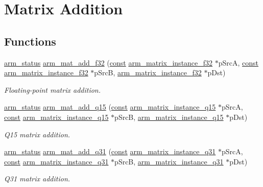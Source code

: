 \hypertarget{group___matrix_add}{\section{Matrix Addition}
\label{group___matrix_add}
}
\subsection*{Functions}
\begin{DoxyCompactItemize}
\item 
\hyperlink{arm__math_8h_a5e459c6409dfcd2927bb8a57491d7cf6}{arm\-\_\-status} \hyperlink{group___matrix_add_ga04bbf64a5f9c9e57dd1efb26a768aba1}{arm\-\_\-mat\-\_\-add\-\_\-f32} (\hyperlink{group___n_a_m_e_ga7ae6d0e43244213b34de2c2b9aa30da6}{const} \hyperlink{structarm__matrix__instance__f32}{arm\-\_\-matrix\-\_\-instance\-\_\-f32} $\ast$p\-Src\-A, \hyperlink{group___n_a_m_e_ga7ae6d0e43244213b34de2c2b9aa30da6}{const} \hyperlink{structarm__matrix__instance__f32}{arm\-\_\-matrix\-\_\-instance\-\_\-f32} $\ast$p\-Src\-B, \hyperlink{structarm__matrix__instance__f32}{arm\-\_\-matrix\-\_\-instance\-\_\-f32} $\ast$p\-Dst)
\begin{DoxyCompactList}\small\item\em Floating-\/point matrix addition. \end{DoxyCompactList}\item 
\hyperlink{arm__math_8h_a5e459c6409dfcd2927bb8a57491d7cf6}{arm\-\_\-status} \hyperlink{group___matrix_add_ga147e90b7c12a162735ab8824127a33ee}{arm\-\_\-mat\-\_\-add\-\_\-q15} (\hyperlink{group___n_a_m_e_ga7ae6d0e43244213b34de2c2b9aa30da6}{const} \hyperlink{structarm__matrix__instance__q15}{arm\-\_\-matrix\-\_\-instance\-\_\-q15} $\ast$p\-Src\-A, \hyperlink{group___n_a_m_e_ga7ae6d0e43244213b34de2c2b9aa30da6}{const} \hyperlink{structarm__matrix__instance__q15}{arm\-\_\-matrix\-\_\-instance\-\_\-q15} $\ast$p\-Src\-B, \hyperlink{structarm__matrix__instance__q15}{arm\-\_\-matrix\-\_\-instance\-\_\-q15} $\ast$p\-Dst)
\begin{DoxyCompactList}\small\item\em Q15 matrix addition. \end{DoxyCompactList}\item 
\hyperlink{arm__math_8h_a5e459c6409dfcd2927bb8a57491d7cf6}{arm\-\_\-status} \hyperlink{group___matrix_add_ga7d9d7d81a0832a17b831aad1e4a5dc16}{arm\-\_\-mat\-\_\-add\-\_\-q31} (\hyperlink{group___n_a_m_e_ga7ae6d0e43244213b34de2c2b9aa30da6}{const} \hyperlink{structarm__matrix__instance__q31}{arm\-\_\-matrix\-\_\-instance\-\_\-q31} $\ast$p\-Src\-A, \hyperlink{group___n_a_m_e_ga7ae6d0e43244213b34de2c2b9aa30da6}{const} \hyperlink{structarm__matrix__instance__q31}{arm\-\_\-matrix\-\_\-instance\-\_\-q31} $\ast$p\-Src\-B, \hyperlink{structarm__matrix__instance__q31}{arm\-\_\-matrix\-\_\-instance\-\_\-q31} $\ast$p\-Dst)
\begin{DoxyCompactList}\small\item\em Q31 matrix addition. \end{DoxyCompactList}\end{DoxyCompactItemize}


